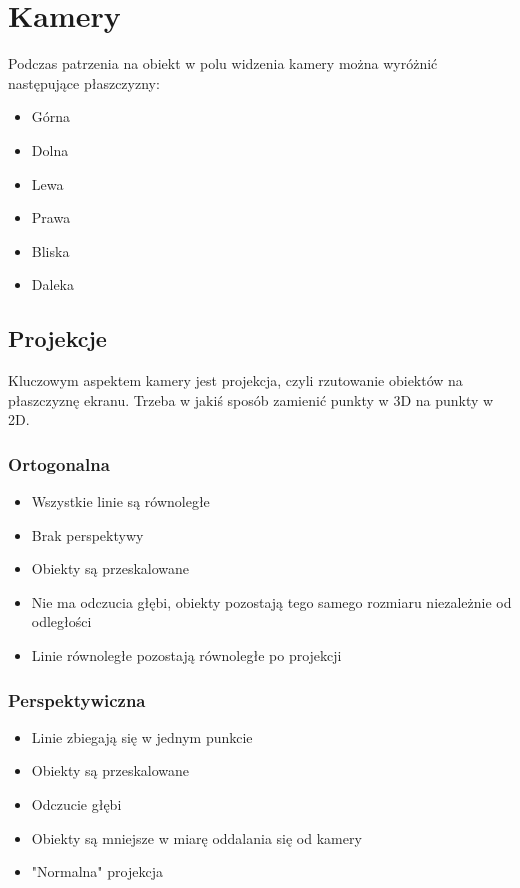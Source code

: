 \documentclass{../notatki}
\begin{document}
\section{Kamery}

Podczas patrzenia na obiekt w polu widzenia kamery można wyróżnić następujące płaszczyzny:

\begin{itemize}
    \item Górna
    \item Dolna
    \item Lewa
    \item Prawa
    \item Bliska
    \item Daleka
\end{itemize}

\subsection{Projekcje}

Kluczowym aspektem kamery jest projekcja, czyli rzutowanie obiektów na płaszczyznę ekranu.
Trzeba w jakiś sposób zamienić punkty w 3D na punkty w 2D.

\subsubsection{Ortogonalna}

\begin{itemize}
    \item Wszystkie linie są równoległe
    \item Brak perspektywy
    \item Obiekty są przeskalowane
    \item Nie ma odczucia głębi, obiekty pozostają tego samego rozmiaru niezależnie od odległości
    \item Linie równoległe pozostają równoległe po projekcji
\end{itemize}

\subsubsection{Perspektywiczna}

\begin{itemize}
    \item Linie zbiegają się w jednym punkcie
    \item Obiekty są przeskalowane
    \item Odczucie głębi
    \item Obiekty są mniejsze w miarę oddalania się od kamery
    \item "Normalna" projekcja
\end{itemize}
\end{document}
